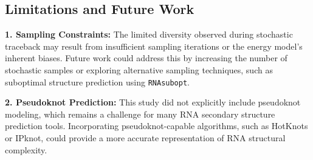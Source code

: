 \documentclass[10pt]{wlscirep}
\begin{document}
\subsection{Limitations and Future Work}

\textbf{1. Sampling Constraints:}  
The limited diversity observed during stochastic traceback may result from insufficient sampling iterations or the energy model's inherent biases. Future work could address this by increasing the number of stochastic samples or exploring alternative sampling techniques, such as suboptimal structure prediction using \texttt{RNAsubopt}.

\textbf{2. Pseudoknot Prediction:}  
This study did not explicitly include pseudoknot modeling, which remains a challenge for many RNA secondary structure prediction tools. Incorporating pseudoknot-capable algorithms, such as HotKnots or IPknot, could provide a more accurate representation of RNA structural complexity.










\label{mylastpage}
\newpage
\fancyfoot{}
 
 
\end{document}
